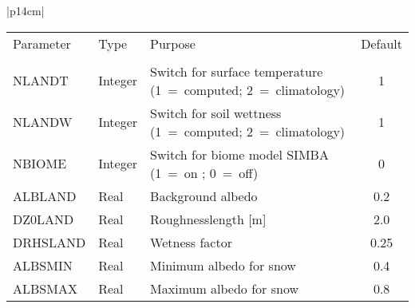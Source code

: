 \begin{center}
\begin{tabular}{|p{14cm}|}
 \vspace{1mm} 

\begin{center}
\begin{tabular}{l l p{5cm} c} %
Parameter & Type & Purpose & Default \\
&&&\\
NLANDT & Integer &  Switch for surface temperature (1~=~computed; 2~=~climatology) &
1 \\
NLANDW & Integer &  Switch for soil wettness (1~=~computed; 2~=~climatology) & 1 \\
NBIOME & Integer & Switch for biome model SIMBA (1~=~on ; 0~=~off) & 0 \\
ALBLAND & Real & Background albedo & 0.2 \\
DZ0LAND & Real & Roughnesslength [m]& 2.0 \\
DRHSLAND & Real & Wetness factor & 0.25 \\
ALBSMIN & Real& Minimum albedo for snow & 0.4 \\
ALBSMAX & Real& Maximum albedo for snow & 0.8 
\end{tabular}
\end{center}
\end{tabular}
\end{center}

\newpage 

